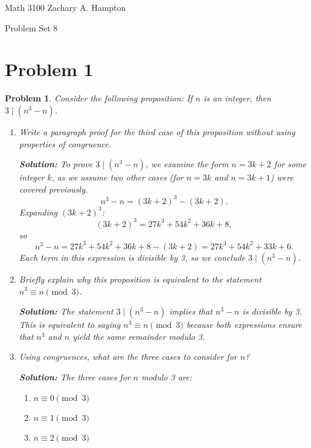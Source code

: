 \documentclass[12pt]{article}
\newtheorem{problem}{Problem}
\theoremstyle{definition}
\begin{document}
Math 3100 \hfill Zachary A. Hampton

Problem Set 8 \hfill 
{}

\bigskip

\section*{Problem 1}

\begin{problem}
Consider the following proposition: If \( n \) is an integer, then \( 3 \mid (n^3 - n) \).

\begin{enumerate}[label=(\alph*)]
    \item Write a paragraph proof for the third case of this proposition without using properties of congruence.
    
    \textbf{Solution:} To prove \( 3 \mid (n^3 - n) \), we examine the form \( n = 3k + 2 \) for some integer \( k \), as we assume two other cases (for \( n = 3k \) and \( n = 3k + 1 \)) were covered previously.
    \[
    n^3 - n = (3k + 2)^3 - (3k + 2).
    \]
    Expanding \( (3k + 2)^3 \):
    \[
    (3k + 2)^3 = 27k^3 + 54k^2 + 36k + 8,
    \]
    so
    \[
    n^3 - n = 27k^3 + 54k^2 + 36k + 8 - (3k + 2) = 27k^3 + 54k^2 + 33k + 6.
    \]
    Each term in this expression is divisible by 3, so we conclude \( 3 \mid (n^3 - n) \).

    \item Briefly explain why this proposition is equivalent to the statement \( n^3 \equiv n \pmod{3} \).
    
    \textbf{Solution:} The statement \( 3 \mid (n^3 - n) \) implies that \( n^3 - n \) is divisible by 3. This is equivalent to saying \( n^3 \equiv n \pmod{3} \) because both expressions ensure that \( n^3 \) and \( n \) yield the same remainder modulo 3.

    \item Using congruences, what are the three cases to consider for \( n \)?

    \textbf{Solution:} The three cases for \( n \) modulo 3 are:
    \begin{enumerate}
        \item \( n \equiv 0 \pmod{3} \)
        \item \( n \equiv 1 \pmod{3} \)
        \item \( n \equiv 2 \pmod{3} \)
    \end{enumerate}
    

\end{enumerate}
\end{problem}
\end{document}
